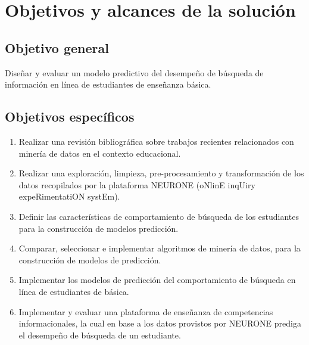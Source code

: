 \chapter{Objetivos y alcances de la solución}
\label{chp:objetivos}
\setcounter{page}{1}

\section{Objetivo general}
\label{sec:objetivo-general}
Diseñar y evaluar un modelo predictivo del desempeño de búsqueda de información en línea de estudiantes de enseñanza básica.

\section{Objetivos específicos}
\label{sec:objetivo-especificos}

\begin{enumerate}
	\item Realizar una revisión bibliográfica sobre trabajos recientes relacionados con minería de datos en el contexto educacional.
	\item Realizar una exploración, limpieza, pre-procesamiento y transformación de los datos recopilados por la plataforma NEURONE (oNlinE inqUiry expeRimentatiON systEm).
	\item Definir las características de comportamiento de búsqueda de los estudiantes para la construcción de modelos predicción.
	\item Comparar, seleccionar e implementar algoritmos de minería de datos, para la construcción de modelos de predicción.
	\item Implementar los modelos de predicción del comportamiento de búsqueda en línea de estudiantes de básica.
	\item Implementar y evaluar una plataforma de enseñanza de competencias informacionales, la cual en base a los datos provistos por NEURONE prediga el desempeño de búsqueda de un estudiante.
\end{enumerate}
